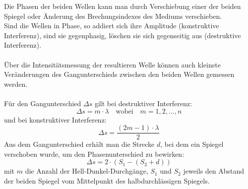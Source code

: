 \documentclass[a4paper,titlepage]{scrartcl}
\numberwithin{equation}{section}
\begin{document}
Die Phasen der beiden Wellen kann man durch Verschiebung einer der beiden Spiegel oder Änderung des Brechungsindexes des Mediums verschieben.\\
Sind die Wellen in Phase, so addiert sich ihre Amplitude (konstruktive Interferenz), sind sie gegenphasig, löschen sie sich gegenseitig aus (destruktive Interferenz).\\ \\
Über die Intensitätsmessung der resultieren Welle können auch kleinste Veränderungen des Gangunterschieds zwischen den beiden Wellen gemessen werden.\\ \\
Für den Gangunterschied $\Delta s$ gilt bei destruktiver Interferenz:
\begin{equation*}
\Delta s = m \cdot \lambda \quad \text{wobei} \quad m=1,2,...,n
\end{equation*}
und bei konstruktiver Interferenz:
\begin{equation*}
\Delta s = \frac{(2m - 1) \cdot \lambda}{2}
\end{equation*}
Aus dem Gangunterschied erhält man die Strecke $d$, bei dem ein Spiegel verschoben wurde, um den Phasenunterschied zu bewirken:
\begin{equation*}
\Delta s = 2 \cdot (S_1 - (S_2 + d))
\end{equation*}
mit $m$ die Anzahl der Hell-Dunkel-Durchgänge, $S_1$ und $S_2$ jeweils den Abstand der beiden Spiegel vom Mittelpunkt des halbdurchlässigen Spiegels.
\end{document}

